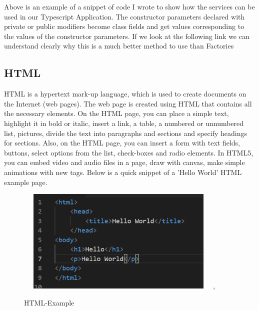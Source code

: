 \documentclass[12pt,a4paper,oneside,openany]{book}
\begin{document}
Above is an example of a snippet of code I wrote to show how the services can be used in our Typescript Application.
The constructor parameters declared with private or public modifiers become class fields and get values corresponding to the values of the constructor parameters. If we look at the following link we can understand clearly why this is a much better method to use than Factories \cite{factory}

\subsection{HTML}
HTML is a hypertext mark-up language, which is used to create documents on the Internet (web pages). The web page is created using HTML that contains all the necessary elements. On the HTML page, you can place a simple text, highlight it in bold or italic, insert a link, a table, a numbered or unnumbered list, pictures, divide the text into paragraphs and sections and specify headings for sections. Also, on the HTML page, you can insert a form with text fields, buttons, select options from the list, check-boxes and radio elements. In HTML5, you can embed video and audio files in a page,
draw with canvas, make simple animations with new tags. Below is a quick snippet of a 'Hello World' HTML example page.
\cite{html}

\begin{figure}[ht]
\renewcommand\thefigure{4.4}
\centering
\includegraphics[width=10cm, height=5cm]{Images/html.png},
\caption{HTML-Example}
\label{html}
\end{figure} 
 
\end{document}
